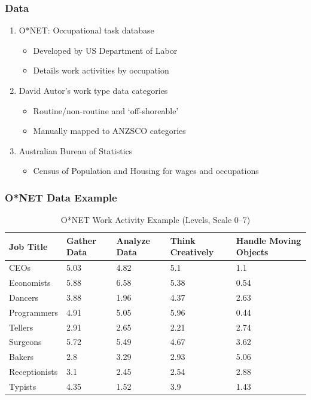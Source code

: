 \documentclass[red]{beamer}
\begin{document}
\begin{frame}
  \frametitle{Data}
  \begin{enumerate}
  \item O*NET: Occupational task database
    \begin{itemize}
    \item Developed by US Department of Labor
    \item Details work activities by occupation
    \end{itemize}
    \vspace{10pt}
  \item David Autor's work type data categories
    \begin{itemize}
    \item Routine/non-routine and `off-shoreable'
    \item Manually mapped to ANZSCO categories
    \end{itemize}
    \vspace{10pt}
  \item Australian Bureau of Statistics
    \begin{itemize}
    \item Census of Population and Housing for wages and occupations
    \end{itemize}
  \end{enumerate}
\end{frame}

\begin{frame}
\frametitle{O*NET Data Example}
\begin{table}[htbp]
\begin{tabular}{|p{2cm}|p{1.65cm}|p{1.5cm}|p{1.5cm}|p{1.5cm}|}
\hline
{Job Title} & {Gather Data} & {Analyze Data} & {\small Think Creatively} & {Handle Moving Objects} \\ \hline
{CEOs} & 5.03 & 4.82 & 5.1 & 1.1  \\ \hline
{Economists} & 5.88 & 6.58 & 5.38 & 0.54 \\ \hline
{Dancers} & 3.88 & 1.96 & 4.37 & 2.63 \\ \hline
{Programmers} & 4.91 & 5.05 & 5.96 & 0.44 \\ \hline
{Tellers} & 2.91 & 2.65 & 2.21 & 2.74 \\ \hline
{Surgeons} & 5.72 & 5.49 & 4.67 & 3.62 \\ \hline
{Bakers} & 2.8 & 3.29 & 2.93 & 5.06 \\ \hline
{Receptionists} & 3.1 & 2.45 & 2.54 & 2.88 \\ \hline
{Typists} & 4.35 & 1.52 & 3.9 & 1.43 \\ \hline
\end{tabular}
\caption{O*NET Work Activity Example (Levels, Scale 0--7)}
\label{onetex}
\end{table}
\end{frame}
\end{document}
